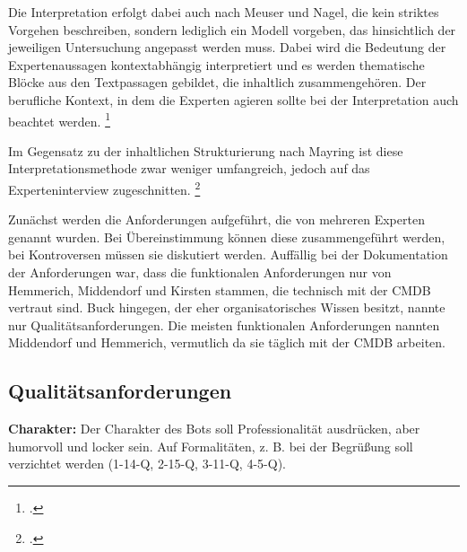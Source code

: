 Die Interpretation erfolgt dabei auch nach Meuser und Nagel, die kein striktes Vorgehen beschreiben, sondern lediglich ein Modell vorgeben, das hinsichtlich der jeweiligen Untersuchung angepasst werden muss.
Dabei wird die Bedeutung der Expertenaussagen kontextabhängig interpretiert und es werden thematische Blöcke aus den Textpassagen gebildet, die inhaltlich zusammengehören.
Der berufliche Kontext, in dem die Experten agieren sollte bei der Interpretation auch beachtet werden.
\footcite[Vgl.][452\psq]{Meuser_1991_Interview}

Im Gegensatz zu der inhaltlichen Strukturierung nach Mayring ist diese Interpretationsmethode zwar weniger umfangreich, jedoch auf das Experteninterview zugeschnitten.
\footcite[Vgl.][103\psq]{Mayring_2015_qualitative_Inhaltsanalyse}

Zunächst werden die Anforderungen aufgeführt, die von mehreren Experten genannt wurden. Bei Übereinstimmung können diese zusammengeführt werden, bei Kontroversen müssen sie diskutiert werden. Auffällig bei der Dokumentation der Anforderungen war, dass die funktionalen Anforderungen nur von Hemmerich, Middendorf und Kirsten stammen, die technisch mit der \acs{CMDB} vertraut sind. Buck hingegen, der eher organisatorisches Wissen besitzt, nannte nur Qualitätsanforderungen. Die meisten funktionalen Anforderungen nannten Middendorf und Hemmerich, vermutlich da sie täglich mit der \acs{CMDB} arbeiten.


\subsection{Qualitätsanforderungen}

\textbf{Charakter:} Der Charakter des Bots soll Professionalität ausdrücken, aber humorvoll und locker sein. Auf Formalitäten, z. B. bei der Begrüßung soll verzichtet werden (1-14-Q, 2-15-Q, 3-11-Q, 4-5-Q).

